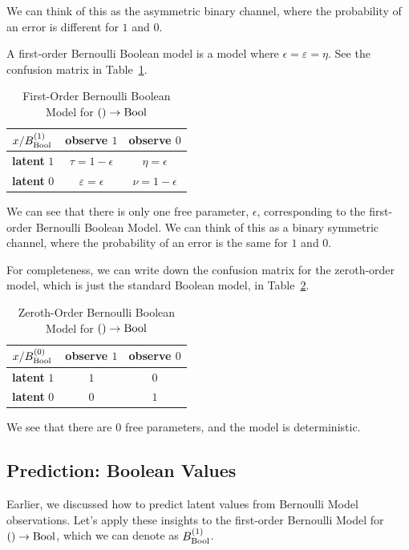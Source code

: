 \documentclass[../main.tex]{subfiles}
\begin{document}
We can think of this as the asymmetric binary channel, where the probability of an error is different for $1$ and $0$.

A first-order Bernoulli Boolean model is a model where $\epsilon = \varepsilon = \eta$. See the confusion matrix in Table~\ref{tbl:first_order}.

\begin{table}[htbp]
\centering
\caption{First-Order Bernoulli Boolean Model for $() \to \mathrm{Bool}$}
\label{tbl:first_order}
\begin{tabular}{@{}lcc@{}}
\toprule
$x / B_{\mathrm{Bool}}^{(1)}$ & observe $1$ & observe $0$ \\
\midrule
\textbf{latent} $1$ & $\tau =1-\epsilon$ & $\eta = \epsilon$ \\
\textbf{latent} $0$ & $\varepsilon = \epsilon$ & $\nu = 1-\epsilon$ \\
\bottomrule
\end{tabular}
\end{table}

We can see that there is only one free parameter, $\epsilon$, corresponding to the first-order Bernoulli Boolean Model. We can think of this as a binary symmetric channel, where the probability of an error is the same for $1$ and $0$.

For completeness, we can write down the confusion matrix for the zeroth-order model, which is just the standard Boolean model, in Table~\ref{tbl:zeroth_order}.

\begin{table}[htbp]
\centering
\caption{Zeroth-Order Bernoulli Boolean Model for $() \to \mathrm{Bool}$}
\label{tbl:zeroth_order}
\begin{tabular}{@{}lcc@{}}
\toprule
$x / B_{\mathrm{Bool}}^{(0)}$ & observe $1$ & observe $0$ \\
\midrule
\textbf{latent} $1$ & $1$ & $0$ \\
\textbf{latent} $0$ & $0$ & $1$ \\
\bottomrule
\end{tabular}
\end{table}

We see that there are 0 free parameters, and the model is deterministic.

\subsection{Prediction: Boolean Values}

Earlier, we discussed how to predict latent values from Bernoulli Model observations. Let's apply these insights to the first-order Bernoulli Model for $() \to \mathrm{Bool}$, which we can denote as $B_{\mathrm{Bool}}^{(1)}$.
\end{document}
